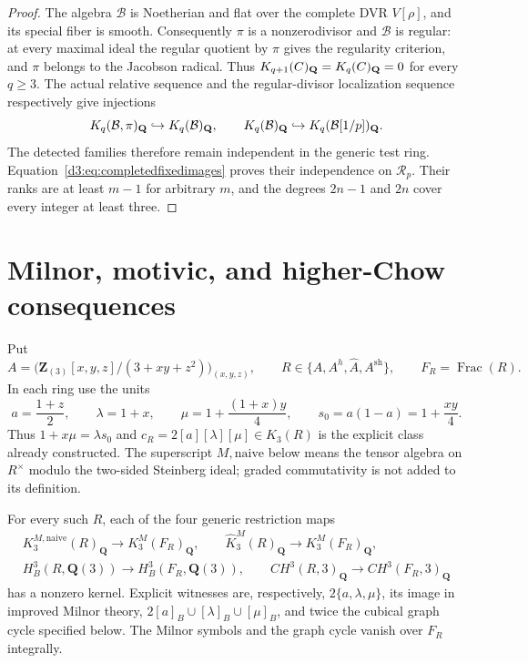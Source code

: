 \begin{proof}
The algebra $\mathcal B$ is Noetherian and flat over the complete
DVR $V[\rho]$, and its special fiber is smooth.
Consequently $\pi$ is a nonzerodivisor and $\mathcal B$ is regular:
at every maximal ideal the regular quotient by $\pi$ gives the
regularity criterion, and $\pi$ belongs to the Jacobson radical.
Thus $K_{q+1}(C)_{\mathbf Q}=K_q(C)_{\mathbf Q}=0$ for every $q\geq3$.
The actual relative sequence and the regular-divisor
localization sequence respectively give injections
\[
 K_q(\mathcal B,\pi)_{\mathbf Q}\hookrightarrow K_q(\mathcal B)_{\mathbf Q},
 \qquad
 K_q(\mathcal B)_{\mathbf Q}\hookrightarrow
                     K_q(\mathcal B[1/p])_{\mathbf Q}.
\]
The detected families therefore remain independent in the
generic test ring. Equation~\eqref{d3:eq:completedfixedimages}
proves their independence on $\mathcal R_p$.
Their ranks are at least $m-1$ for arbitrary $m$, and the
degrees $2n-1$ and $2n$ cover every integer at least three.
\end{proof}


\section{Milnor, motivic, and higher-Chow consequences}
\label{d3:sec:milnormotivicconsequences}

Put
\[
 A=\bigl(\mathbf Z_{(3)}[x,y,z]/(3+xy+z^2)\bigr)_{(x,y,z)},
 \qquad R\in\{A,A^h,\widehat A,A^{\mathrm{sh}}\},
 \qquad F_R=\operatorname{Frac}(R).
\]
In each ring use the units
\[
 a=\frac{1+z}{2},\qquad \lambda=1+x,\qquad
 \mu=1+\frac{(1+x)y}{4},\qquad
 s_0=a(1-a)=1+\frac{xy}{4}.
\]
Thus $1+x\mu=\lambda s_0$ and
$c_R=2[a][\lambda][\mu]\in K_3(R)$ is the explicit class already
constructed. The superscript $M,\mathrm{naive}$ below means the
tensor algebra on $R^\times$ modulo the two-sided Steinberg ideal;
graded commutativity is not added to its definition.

\begin{corollary}\label{d3:cor:explicitmilnormotivic}
For every such $R$, each of the four generic restriction maps
\[
\begin{gathered}
 K_3^{M,\mathrm{naive}}(R)_{\mathbf Q}
       \longrightarrow K_3^M(F_R)_{\mathbf Q},\qquad
 \widehat K_3^M(R)_{\mathbf Q}
       \longrightarrow K_3^M(F_R)_{\mathbf Q},\\
 H_B^3(R,\mathbf Q(3))\longrightarrow H_B^3(F_R,\mathbf Q(3)),
 \qquad
 CH^3(R,3)_{\mathbf Q}\longrightarrow CH^3(F_R,3)_{\mathbf Q}
\end{gathered}
\]
has a nonzero kernel. Explicit witnesses are, respectively,
$2\{a,\lambda,\mu\}$, its image in improved Milnor theory,
$2[a]_B\cup[\lambda]_B\cup[\mu]_B$, and twice the cubical graph
cycle specified below. The Milnor symbols and the graph cycle vanish
over $F_R$ integrally.
\end{corollary}

